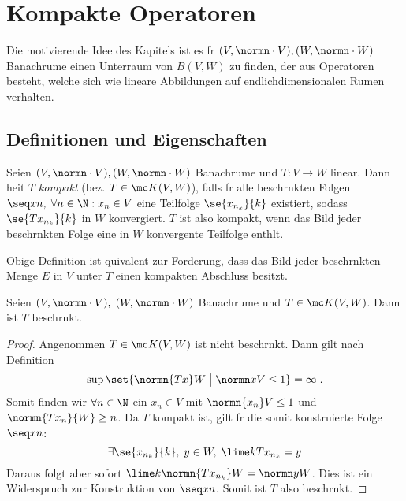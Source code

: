 \chapter{Kompakte Operatoren}
\begin{rem}[Motivation]
	Die motivierende Idee des Kapitels ist es f\us r \((V,\normn\cdot V),(W,\normn\cdot W)\) Banachr\as ume einen Unterraum von \(B(V,W)\) zu finden, der aus Operatoren besteht, welche sich wie lineare Abbildungen auf endlichdimensionalen R\as umen verhalten.
\end{rem}

\section{Definitionen und Eigenschaften}
\begin{definition}
	Seien \((V,\normn\cdot V), (W,\normn\cdot W)\) Banachr\as ume und \(T: V\to W\) linear. Dann hei\s t $T$ \textit{kompakt} (bez. \(T\in \mc K(V,W)\)), falls f\us r alle beschr\as nkten Folgen \(\seq xn,\; \forall n\in \N: x_n \in V\) eine Teilfolge \(\se{x_{n_k}}{k}\) existiert, sodass \(\se{Tx_{n_k}}{k}\) in $W$ konvergiert. $T$ ist also kompakt, wenn das Bild jeder beschr\as nkten Folge eine in $W$ konvergente Teilfolge enth\as lt.
\end{definition}

\begin{rem}
  Obige Definition ist \as quivalent zur Forderung, dass das Bild jeder beschr\as nkten Menge $E$ in $V$ unter $T$ einen kompakten Abschluss besitzt.	
\end{rem}

\begin{theorem}
	Seien \((V,\normn\cdot V),\;(W,\normn\cdot W)\) Banachr\as ume und \(T\in\mc K(V,W)\). Dann ist $T$ beschr\as nkt.
\end{theorem}
\begin{proof}
	Angenommen $T\in \mc K(V,W)$ ist nicht beschr\as nkt. Dann gilt nach Definition 
	\[\sup\set{\normn{Tx}W \;\big\vert\; \normn xV \leq 1} = \infty\;.\]
	Somit finden wir \(\forall n\in\N\) ein \(x_n\in V\) mit \(\normn{x_n}V \leq 1\) und \(\normn{Tx_n}{W}\geq n\). Da $T$ kompakt ist, gilt f\us r die somit konstruierte Folge \(\seq xn\):
	\[\exists \se{x_{n_k}}{k}, \; y\in W,\; \lime k Tx_{n_k} = y\]
	Daraus folgt aber sofort \(\lime k \normn{Tx_{n_k}}W = \normn yW\). Dies ist ein Widerspruch zur Konstruktion von \(\seq xn\). Somit ist $T$ also beschr\as nkt.
	\end{proof}

